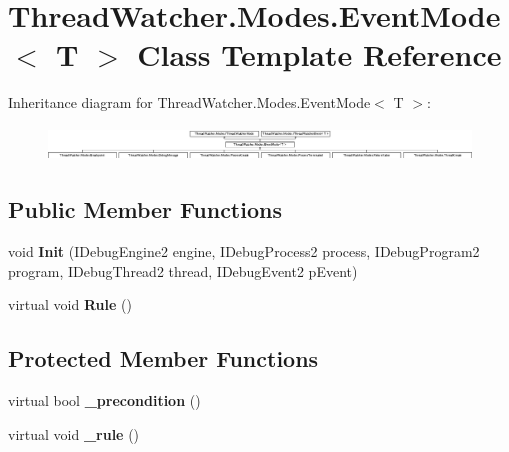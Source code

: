 \hypertarget{class_thread_watcher_1_1_modes_1_1_event_mode_3_01_t_01_4}{\section{Thread\+Watcher.\+Modes.\+Event\+Mode$<$ T $>$ Class Template Reference}
\label{class_thread_watcher_1_1_modes_1_1_event_mode_3_01_t_01_4}
}
Inheritance diagram for Thread\+Watcher.\+Modes.\+Event\+Mode$<$ T $>$\+:\begin{figure}[H]
\begin{center}
\leavevmode
\includegraphics[height=0.915033cm]{class_thread_watcher_1_1_modes_1_1_event_mode_3_01_t_01_4}
\end{center}
\end{figure}
\subsection*{Public Member Functions}
\begin{DoxyCompactItemize}
\item 
\hypertarget{class_thread_watcher_1_1_modes_1_1_event_mode_3_01_t_01_4_ac5d162d3130e20b2e581589bc002c578}{void {\bfseries Init} (I\+Debug\+Engine2 engine, I\+Debug\+Process2 process, I\+Debug\+Program2 program, I\+Debug\+Thread2 thread, I\+Debug\+Event2 p\+Event)}\label{class_thread_watcher_1_1_modes_1_1_event_mode_3_01_t_01_4_ac5d162d3130e20b2e581589bc002c578}

\item 
\hypertarget{class_thread_watcher_1_1_modes_1_1_event_mode_3_01_t_01_4_a25a40a6d4c3948f2fadc40c8f7ffd691}{virtual void {\bfseries Rule} ()}\label{class_thread_watcher_1_1_modes_1_1_event_mode_3_01_t_01_4_a25a40a6d4c3948f2fadc40c8f7ffd691}

\end{DoxyCompactItemize}
\subsection*{Protected Member Functions}
\begin{DoxyCompactItemize}
\item 
\hypertarget{class_thread_watcher_1_1_modes_1_1_event_mode_3_01_t_01_4_a0ad15acc628c9d07484dd79245e08336}{virtual bool {\bfseries \+\_\+precondition} ()}\label{class_thread_watcher_1_1_modes_1_1_event_mode_3_01_t_01_4_a0ad15acc628c9d07484dd79245e08336}

\item 
\hypertarget{class_thread_watcher_1_1_modes_1_1_event_mode_3_01_t_01_4_abceb8229b0bc4210d5acdf1ccc0bf2eb}{virtual void {\bfseries \+\_\+rule} ()}\label{class_thread_watcher_1_1_modes_1_1_event_mode_3_01_t_01_4_abceb8229b0bc4210d5acdf1ccc0bf2eb}

\end{DoxyCompactItemize}
